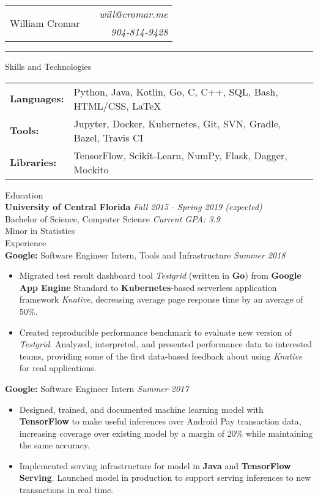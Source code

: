 \documentclass[letterpaper,11pt,oneside]{article}
\newcommand{\mkheader}[3]{
  {\fontfamily{pag}\selectfont
  \begin{tabularx}{\textwidth}{lXr}
    \multirow{2}{*}{\Huge #1} && \emph{#2}
    \\ && \emph{#3}
  \end{tabularx}
  }
  \vspace{2pt}
  \hrule
}
\newcommand{\resheader}[2][]{
  \vspace{9pt}
  {\LARGE #2} #1
  \\
}
\newcommand{\ressubheader}[3][]{
  \vspace{6pt}
  {\textbf{#2} #1} \hfill \emph{#3}
  \\
}
\newcommand{\resskill}[1]{\textbf{#1}}
\begin{document}
\mkheader{William Cromar}{will@cromar.me}{904-814-9428}

\resheader{Skills and Technologies}
\vspace{6pt}
\begin{tabular}{>{\bfseries}l@{\hskip .25cm} l}
  Languages: & Python, Java, Kotlin, Go, C, C++, SQL, Bash, HTML/CSS, LaTeX \\
  Tools: & Jupyter, Docker, Kubernetes, Git, SVN, Gradle, Bazel, Travis CI \\
  Libraries: & TensorFlow, Scikit-Learn, NumPy, Flask, Dagger, Mockito \\
\end{tabular}


\resheader{Education}
\ressubheader{University of Central Florida}{Fall 2015 - Spring 2019 (expected)}
Bachelor of Science, Computer Science \hfill \emph{Current GPA: 3.9} \\
Minor in Statistics \\

\resheader{Experience}
\ressubheader[Software Engineer Intern, Tools and Infrastructure]{Google:}{Summer 2018}
\begin{itemize}
  \item Migrated test result dashboard tool \emph{Testgrid} (written in \resskill{Go}) from \resskill{Google App Engine} Standard to \resskill{Kubernetes}-based serverless application framework \emph{Knative}, decreasing average page response time by an average of 50\%.
  \item Created reproducible performance benchmark to evaluate new version of \emph{Testgrid}. Analyzed, interpreted, and presented performance data to interested teams, providing some of the first data-based feedback about using \emph{Knative} for real applications.
\end{itemize}

\ressubheader[Software Engineer Intern]{Google:}{Summer 2017}
\begin{itemize}
  \item Designed, trained, and documented machine learning model with \resskill{TensorFlow} to make useful inferences over Android Pay transaction data, increasing coverage over existing model by a margin of 20\% while maintaining the same accuracy.
  \item Implemented serving infrastructure for model in \resskill{Java} and \resskill{TensorFlow Serving}. Launched model in production to support serving inferences to new transactions in real time.
\end{itemize}
\end{document}
